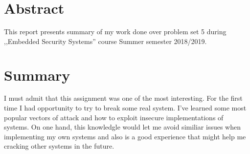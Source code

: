 \documentclass[12pt]{article}
\begin{document}


\section{Abstract}

This report presents summary of my work done over problem set 5
during ,,Embedded Security Systems'' course Summer semester 2018/2019.



\section{Summary}

I must admit that this assignment was one of the most interesting. For the first time I had opportunity to try to break some real system. I've learned some most popular vectors of attack and how to exploit insecure implementations of systems. On one hand, this knowledgle would let me avoid similiar issues when implementing my own systems and also is a good experience that might help me cracking other systems in the future.
\end{document}
